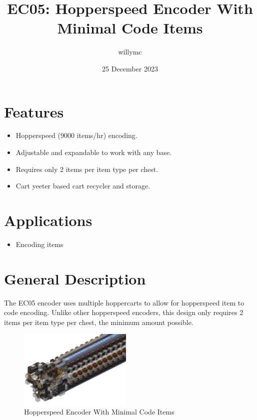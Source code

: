 \documentclass[10pt]{datasheet}
\title{EC05: Hopperspeed Encoder With Minimal Code Items}
\author{willymc}
\date{25 December 2023}
\begin{document}
\maketitle

\section{Features}

\begin{itemize}
\item{Hopperspeed (9000 items/hr) encoding.}
\item{Adjustable and expandable to work with any base.}
\item{Requires only 2 items per item type per chest.}
\item{Cart yeeter based cart recycler and storage.}
\end{itemize}

\section{Applications}

\begin{itemize}
\item{Encoding items}
\end{itemize}

\section{General Description}
The EC05 encoder uses multiple hoppercarts to allow for hopperspeed item to code encoding. Unlike other hopperspeed encoders, this design only requires 2 items per item type per chest, the minimum amount possible.

\vfill\break

\begin{figure}[h]
    \centering
    \includegraphics[width=0.48\textwidth]{pic.png}
    \caption{\centering Hopperspeed Encoder With Minimal Code Items}
\end{figure}
\end{document}
